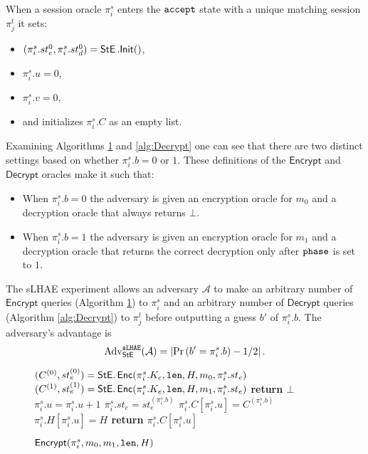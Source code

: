 \documentclass[USenglish,oneside,twocolumn]{article}
\theoremstyle{dgthm}
\theoremstyle{dgdef}
\newcommand{\Protocol}[1]{\operatorname{\mathsf{#1}}}
\newcommand{\abs}[1]{\left\vert#1\right\vert}
\newcommand{\AlgorithmName}[1]{\operatorname{\mathsf{#1}}}
\newcommand{\STE}{\AlgorithmName{StE}}
\newcommand{\PEnc}[1]{\AlgorithmName{StE.Enc}}
\newcommand{\p}[2]{\pi_{#1}^{#2}}
\newcommand{\Oracle}[1]{\mathcal #1}
\newcommand{\Token}[1]{\textnormal{\tt{#1}}}
\newcommand{\accept}{\Token{accept}}
\newcommand{\phase}{\Token{phase}}
\newcommand{\AdvInt}[1]{\mathsf{#1}}
\newcommand{\Encrypt}{\AdvInt{Encrypt}}
\newcommand{\Decrypt}{\AdvInt{Decrypt}}
\newcommand{\CPrb}[1]{\mathrm{Pr}\left(#1\right)}
\newcommand{\Experiment}[1]{\operatorname{\tt{#1}}}
\newcommand{\Algorithm}[1]{\mathcal #1}
\newcommand{\AdvName}[2]{\operatorname{\mathrm{Adv}_{\Protocol{#1}}^{\Experiment{#2}}}}
\newcommand{\Adv}[3]{\AdvName{#1}{#2}(\Algorithm{#3})}
\newcommand{\AdvSlhae}[1]{\Adv{StE}{sLHAE}{#1}}
\begin{document}
  When a session oracle $\p{i}{s}$ enters the $\accept$ state with
  a unique matching session $\p{j}{t}$ it sets:
  \begin{itemize}
    \item $(\p{i}{s}.st_e^0, \p{i}{s}.st_d^0) = \STE.{\sf Init}()$,
    \item $\p{i}{s}.u = 0$,
    \item $\p{i}{s}.v = 0$,
    \item and initializes $\p{i}{s}.C$ as an empty list.
  \end{itemize}

  Examining Algorithms \ref{alg:Encrypt} and \ref{alg:Decrypt} one can see that
  there are two distinct settings based on whether $\p{i}{s}.b = 0$ or $1$.
  These definitions of the $\Encrypt$ and $\Decrypt$ oracles make it such that:
  \begin{itemize}
    \item When $\p{i}{s}.b = 0$ the adversary is given an encryption oracle
      for $m_0$ and a decryption oracle that always returns $\bot$.
    \item When $\p{i}{s}.b = 1$ the adversary is given an encryption oracle
      for $m_1$ and a decryption oracle that returns the correct decryption
      only after $\phase$ is set to $1$.
  \end{itemize}

  The sLHAE experiment allows an adversary $\Oracle{A}$ to make an arbitrary
  number of $\Encrypt$ queries (Algorithm \ref{alg:Encrypt}) to $\p{i}{s}$ and
  an arbitrary number of $\Decrypt$ queries (Algorithm \ref{alg:Decrypt}) to
  $\p{j}{t}$ before outputting a guess $b'$ of $\p{i}{s}.b$. The adversary's
  advantage is \[\AdvSlhae{A} = \abs{\CPrb{b' = \p{i}{s}.b} - 1/2}.\]

\captionsetup[figure]{name=Alg.}

  \begin{figure}
  \caption{$\Encrypt(\p{i}{s}, m_0, m_1, \Token{len}, H)$}
  \label{alg:Encrypt}
  \begin{algorithmic}
    \STATE $(C^{(0)}, st_e^{(0)}) = \PEnc{c}(\p{i}{s}.K_e, \Token{len}, H, m_0, \p{i}{s}.st_e)$
    \STATE $(C^{(1)}, st_e^{(1)}) = \PEnc{c}(\p{i}{s}.K_e, \Token{len}, H, m_1, \p{i}{s}.st_e)$
    \STATE \bf{return} $\bot$
    \ENDIF
    \STATE $\p{i}{s}.u = \p{i}{s}.u + 1$
    \STATE $\p{i}{s}.st_e = st_e^{(\p{i}{s}.b)}$
    \STATE $\p{i}{s}.C[\p{i}{s}.u] = C^{(\p{i}{s}.b)}$
    \STATE $\p{i}{s}.H[\p{i}{s}.u] = H$
    \STATE \bf{return} $\p{i}{s}.C[\p{i}{s}.u]$
  \end{algorithmic}
  \end{figure}
\end{document}
